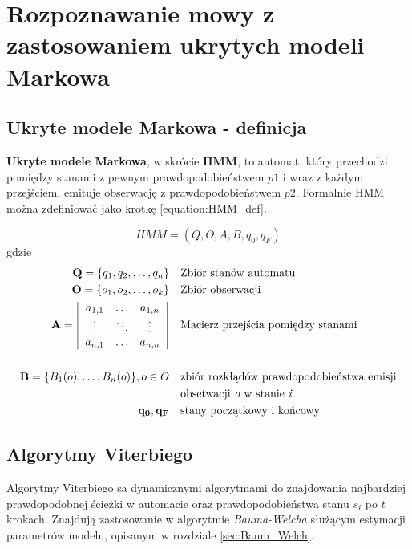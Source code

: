 \documentclass[shortabstract, mgr]{iithesis}
\begin{document}
\section {Rozpoznawanie mowy z zastosowaniem ukrytych modeli Markowa}
	\label{sec:ASR_HMM}
    \subsection{Ukryte modele Markowa - definicja}
	    \label{sec:hmm_def}
    
	    \textbf{Ukryte modele Markowa}, w skrócie \textbf{HMM}, to automat, który przechodzi pomiędzy stanami z pewnym prawdopodobieństwem $p1$ i wraz z każdym przejściem, emituje obserwację z prawdopodobieństwem $p2$. Formalnie HMM można zdefiniować jako krotkę \ref{equation:HMM_def}.
	    
	    \begin{equation}
		    HMM = (Q, O, A, B, q_0, q_F)
		    \label{equation:HMM_def}
	    \end{equation}
	    gdzie
	    \begin{align*}
		    \mathbf{Q}=\{q_1, q_2,\ldots,q_n\} & &&  \text{Zbiór stanów automatu} \\
	 	    \mathbf{O}=\{o_1, o_2,\ldots,o_k\} & &&  \text{Zbiór obserwacji} \\
	 	    \mathbf{A} =
	 	    \left| \begin{array}{ccc}
		 	    a_{1,1} & \ldots & a_{1,n} \\
		 	    \vdots  & \ddots & \vdots\\
		 	    a_{n,1} & \ldots & a_{n,n}
	 	    \end{array} \right|
												 	    & &&  \text{Macierz przejścia pomiędzy stanami} \\
												 	    & && \\
	 	    \mathbf{B}=\{B_1(o),\ldots,B_n(o)\},o \in O & && \text{zbiór rozkłądów prawdopodobieństwa emisji} \\ 
													 	& && \text{obsetwacji \textit{o} w stanie \textit{i}} \\
		 	\mathbf{q_0, q_F}				  & && \text{stany początkowy i końcowy}
	    \end{align*}
	    
	   \subsection{Algorytmy Viterbiego}
		   \label{sec:Viterbi}
		   Algorytmy Viterbiego sa dynamicznymi algorytmami do znajdowania najbardziej prawdopodobnej ścieżki w automacie oraz prawdopodobieństwa stanu $s_i$ po $t$ krokach. Znajdują zastosowanie w algorytmie \textit{Bauma-Welcha} służącym estymacji parametrów modelu, opisanym w rozdziale \ref{sec:Baum_Welch}.
		   
\end{document}
